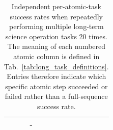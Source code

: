 \documentclass[letterpaper]{article} %
\begin{document}
\begin{table}[!ht]
\begin{tabular}{cccccccccc}
    &&\cellcolor{gray!25}-&\cellcolor{gray!25}{\color{violet}$45\%\uparrow$}&\cellcolor{gray!25}{\color{violet}$15\%\uparrow$}&\cellcolor{gray!25}{\color{violet}$90\%\uparrow$}&\cellcolor{gray!25}{\color{violet}$75\%\uparrow$}&\cellcolor{gray!25}{\color{violet}$35\%\uparrow$}&\cellcolor{gray!25}{\color{violet}$60\%\uparrow$}&\cellcolor{gray!25}{-}\\
  \bottomrule
\end{tabular}
\caption{Independent per-atomic-task success rates when repeatedly performing multiple long-term science operation tasks 20 times. The meaning of each numbered atomic column is defined in Tab.~\ref{tab:long_task_definitions}. Entries therefore indicate which specific atomic step succeeded or failed rather than a full-sequence success rate.}
\label{tab:sci-ops}
\end{table}

\end{document}
